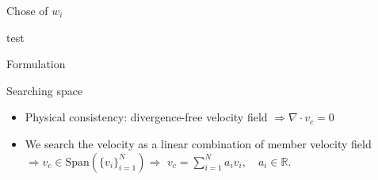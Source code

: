 \documentclass[aspectratio=169]{beamer} %
\DeclareMathOperator*{\argmin}{\arg\!\min}
\begin{document}
\begin{frame}{Chose of $w_i$}

    test
\end{frame}

\begin{frame}{Formulation}

    \begin{block}{Searching space}
        \begin{itemize}
            \item Physical consistency: divergence-free velocity field $\Rightarrow \nabla \cdot v_c = 0$ \\
            \item We search the velocity as a linear combination of member velocity field  \\
                  $\Rightarrow v_c \in \mathrm{Span}\left(\{v_i\}_{i=1}^{N}\right) \Rightarrow$ $v_c = \sum_{i=1}^N a_i v_i, \quad a_i \in \mathbb{R}$.
        \end{itemize}
    \end{block}
    \vfill
    \vfill

\end{frame}
\end{document}
